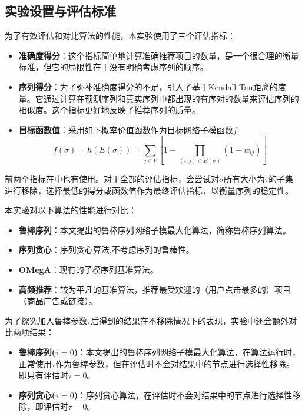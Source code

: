 \subsection{实验设置与评估标准}

为了有效评估和对比算法的性能，本实验使用了三个评估指标：

\begin{itemize}
    \item \textbf{准确度得分}：这个指标简单地计算准确推荐项目的数量，是一个很合理的衡量标准，但它的局限性在于没有明确考虑序列的顺序。
    \item \textbf{序列得分}：为了弥补准确度得分的不足，引入了基于Kendall-Tau距离\cite{kendall1938new}的度量。它通过计算在预测序列和真实序列中都出现的有序对的数量来评估序列的相似度。这个指标更好地反映了推荐序列的质量。
    \item \textbf{目标函数值}：采用如下概率价值函数作为目标网络子模函数$f$:
\begin{equation}
    f(\sigma)=h(E(\sigma))=\sum_{j\in V} [1- \prod_{(i,j)\in E(\sigma)} (1-w_{ij})]
\end{equation}
\end{itemize}

前两个指标在\parencite{mitrovic2019adaptive}中也有使用。对于全部的评估指标，会尝试对$\sigma$所有大小为$\tau$的子集进行移除，选择最低的得分或函数值作为最终评估指标，以衡量序列的稳定性。

本实验对以下算法的性能进行对比：

\begin{itemize}
\item {\bfseries 鲁棒序列}：本文提出的鲁棒序列网络子模最大化算法，简称鲁棒序列算法。
\item {\bfseries 序列贪心}：序列贪心算法\cite{mitrovic2018submodularity},不考虑序列的鲁棒性。
\item {\bfseries OMegA}：现有的子模序列基准算法\cite{tschiatschek2017selecting}。
\item {\bfseries 高频推荐}：较为平凡的基准算法，推荐最受欢迎的（用户点击最多的）项目（商品广告或链接）。
\end{itemize}

为了探究加入鲁棒参数$\tau$后得到的结果在不移除情况下的表现，实验中还会额外对比两项结果：
\begin{itemize}
\item {\bfseries 鲁棒序列($\tau = 0$)}：本文提出的鲁棒序列网络子模最大化算法，在算法运行时，正常使用$\tau$作为鲁棒参数，但在评估时不会对结果中的节点进行选择性移除。即只有评估时$\tau = 0$。
\item {\bfseries 序列贪心($\tau = 0$)}：序列贪心算法，在评估时不会对结果中的节点进行选择性移除，即评估时$\tau = 0$。
\end{itemize}



